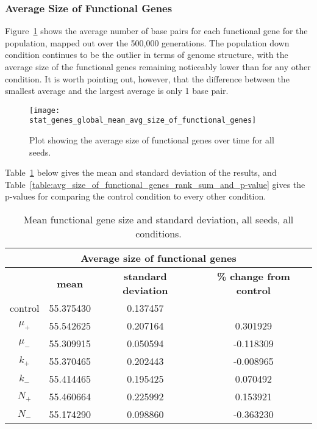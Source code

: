 \subsubsection{Average Size of Functional Genes}\label{sec:average_size_functional_genes}
Figure~\ref{fig:mean_functional_gene_size} shows the average number of base pairs for each functional gene for the population, mapped out over the 500,000 generations. The population down condition continues to be the outlier in terms of genome structure, with the average size of the functional genes remaining noticeably lower than for any other condition. It is worth pointing out, however, that the difference between the smallest average and the largest average is only 1 base pair. 
\begin{figure}[H]
	\centering
	\texttt{[image: stat\_genes\_global\_mean\_avg\_size\_of\_functional\_genes]}
	\caption[Average size of functional genes]{Plot showing the average size of functional genes over time for all seeds.}
	\label{fig:mean_functional_gene_size}
\end{figure}
Table~\ref{table:mean_functional_gene_size_and_std_dev} below gives the mean and standard deviation of the results, and Table~\ref{table:avg_size_of_functional_genes_rank_sum_and_p-value} gives the p-values for comparing the control condition to every other condition. 

\begin{table}[H]
	\centering
	\begin{tabular}{|c|c|c|c|}
		\hline
		\multicolumn{4}{c}{\Large \textbf{Average size of functional genes}} \\
		\hline
		& \textbf{mean} & \textbf{standard deviation} & \textbf{\% change from control} \\
		\hline
		control & 55.375430 & 0.137457 & \textemdash \\ 
		\hline
		$\mu_+$ & 55.542625 & 0.207164 & 0.301929 \\ 
		\hline
		$\mu_-$ & 55.309915 & 0.050594 & -0.118309 \\ 
		\hline
		$k_+$ & 55.370465 & 0.202443 & -0.008965 \\ 
		\hline
		$k_-$ & 55.414465 & 0.195425 & 0.070492 \\ 
		\hline
		$N_+$ & 55.460664 & 0.225992 & 0.153921 \\ 
		\hline
		$N_-$ & 55.174290 & 0.098860 & -0.363230 \\ 
		\hline
	\end{tabular}
	\caption[Mean functional gene size and standard deviation]{Mean functional gene size and standard deviation, all seeds, all conditions.}
	\label{table:mean_functional_gene_size_and_std_dev}
\end{table}

